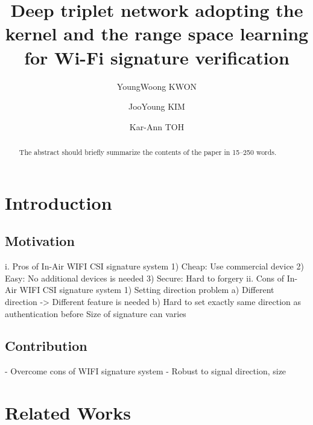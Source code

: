 \documentclass[runningheads]{llncs}
\begin{document}
%
\title{Deep triplet network adopting the kernel and the range space learning for Wi-Fi signature verification}
%
%
\author{YoungWoong KWON \and
JooYoung KIM \and
Kar-Ann TOH}
%
%
%
\maketitle              %
%
\begin{abstract}
The abstract should briefly summarize the contents of the paper in
15--250 words.

\end{abstract}
%
%
%
\section{Introduction}

\subsection{Motivation}
i. Pros of In-Air WIFI CSI signature system
1) Cheap: Use commercial device
2) Easy: No additional devices is needed
3) Secure: Hard to forgery
ii. Cons of In-Air WIFI CSI signature system
1) Setting direction problem
a) Different direction -> Different feature is needed
b) Hard to set exactly same direction as authentication before
Size of signature can varies

\subsection{Contribution}
- Overcome cons of WIFI signature system
- Robust to signal direction, size

\section{Related Works}
\end{document}
